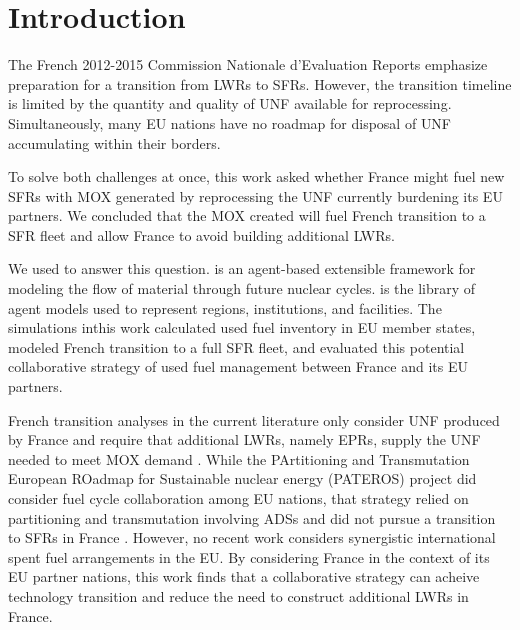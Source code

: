 
\section{Introduction}
The French 2012-2015 Commission Nationale d'Evaluation Reports
\cite{cne2_reports_2015} emphasize preparation for a transition from \glspl{LWR} to \glspl{SFR}.
However, the transition timeline is limited by the quantity and quality 
of \gls{UNF} available for reprocessing. Simultaneously, many \gls{EU} nations 
have no roadmap for disposal of \gls{UNF} accumulating within their borders.

To solve both challenges at once, this work asked whether France might fuel new 
\glspl{SFR} with \gls{MOX} generated by reprocessing the \gls{UNF} currently 
burdening its \gls{EU} partners. We concluded that the \gls{MOX} created will 
fuel French transition to a \gls{SFR} fleet and allow France to avoid building 
additional \glspl{LWR}.

We used \Cyclus \cite{huff_fundamental_2016} to answer this question. 
\Cyclus is an agent-based extensible framework for modeling the flow of 
material through future nuclear cycles.  \Cycamore is the library of agent 
models used to represent regions, institutions, and facilities. The simulations 
inthis work calculated used fuel inventory in \gls{EU} member states, modeled French 
transition to a full \gls{SFR} fleet, and evaluated this potential collaborative
strategy of used fuel management between France and its \gls{EU} partners.

French transition analyses in the current literature only consider \gls{UNF}
produced by France and require that additional \glspl{LWR}, namely \glspl{EPR},
supply the \gls{UNF} needed to meet \gls{MOX} demand \cite{carre_overview_2009,
martin_symbiotic_2017, freynet_multiobjective_2016}.  While the PArtitioning
and  Transmutation  European ROadmap  for  Sustainable nuclear  energy
(PATEROS) project \cite{fazio_study_2013} did consider fuel cycle collaboration
among \gls{EU} nations, that strategy relied on partitioning and transmutation
involving \glspl{ADS} and did not pursue a transition to \glspl{SFR} in France
\cite{fazio_study_2013}.  However, no recent work considers synergistic
international spent fuel arrangements in the \gls{EU}.  By considering France
in the context of its \gls{EU} partner nations, this work finds that a
collaborative strategy can acheive technology transition and reduce the need to
construct additional \glspl{LWR} in France.
